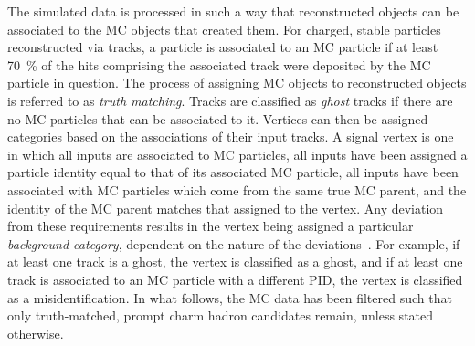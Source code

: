 The simulated data is processed in such a way that reconstructed objects can be 
associated to the \ac{MC} objects that created them.
For charged, stable particles reconstructed via tracks, a particle is 
associated to an \ac{MC} particle if at least \SI{70}{\percent} of the hits 
comprising the associated track were deposited by the \ac{MC} particle in 
question.
The process of assigning \ac{MC} objects to reconstructed objects is referred 
to as \emph{truth matching}.
Tracks are classified as \emph{ghost} tracks if there are no \ac{MC} particles 
that can be associated to it.
Vertices can then be assigned categories based on the associations of their 
input tracks.
A signal vertex is one in which all inputs are associated to \ac{MC} particles, all inputs have been assigned a particle identity equal to that of its associated \ac{MC} particle, all inputs have been associated with \ac{MC} particles which come from the same true \ac{MC} parent, and the identity of the \ac{MC} parent matches that assigned to the vertex.
Any deviation from these requirements results in the vertex being assigned a particular \emph{background category}, dependent on the nature of the deviations~\cite{Gligorov:1035682}.
For example, if at least one track is a ghost, the vertex is classified as a ghost, and if at least one track is associated to an \ac{MC} particle with a different \ac{PID}, the vertex is classified as a misidentification.
In what follows, the \ac{MC} data has been filtered such that only 
truth-matched, prompt charm hadron candidates remain, unless stated otherwise.
